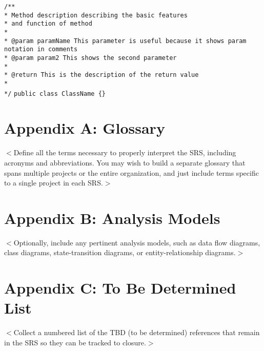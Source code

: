 \documentclass{scrreprt}
\begin{document}
\texttt{/** \\}
\texttt{* Method description describing the basic features \\}
\texttt{* and function of method\\}
\texttt{* \\}
\texttt{* @param paramName This parameter is useful because it shows param notation in comments \\}
\texttt{* @param param2 This shows the second parameter \\}
\texttt{* \\}
\texttt{* @return This is the description of the return value\\}
\texttt{* \\}
\texttt{*/}
\texttt{public class ClassName \{\}}


\section{Appendix A: Glossary}
$<$Define all the terms necessary to properly interpret the SRS, including 
acronyms and abbreviations. You may wish to build a separate glossary that spans 
multiple projects or the entire organization, and just include terms specific to 
a single project in each SRS.$>$

\section{Appendix B: Analysis Models}
$<$Optionally, include any pertinent analysis models, such as data flow 
diagrams, class diagrams, state-transition diagrams, or entity-relationship 
diagrams.$>$

\section{Appendix C: To Be Determined List}
$<$Collect a numbered list of the TBD (to be determined) references that remain 
in the SRS so they can be tracked to closure.$>$
\end{document}

